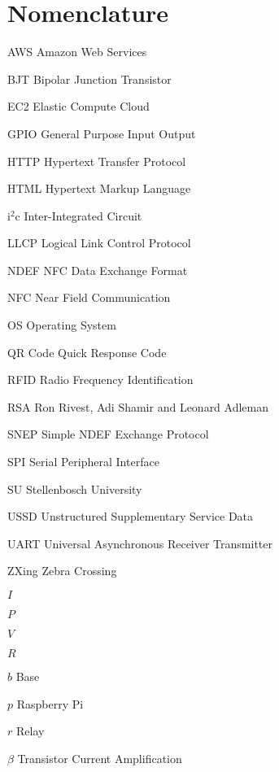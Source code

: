\chapter{Nomenclature}

\begin{Nomencl}
   \item[AWS]\dotfill Amazon Web Services
   \item[BJT]\dotfill Bipolar Junction Transistor
   \item[EC2]\dotfill Elastic Compute Cloud
   \item[GPIO]\dotfill General Purpose Input Output
   \item[HTTP]\dotfill Hypertext Transfer Protocol
   \item[HTML]\dotfill Hypertext Markup Language
   \item[i$^2$c]\dotfill Inter-Integrated Circuit
   \item[LLCP]\dotfill Logical Link Control Protocol
   \item[NDEF]\dotfill NFC Data Exchange Format
   \item[NFC]\dotfill Near Field Communication
   \item[OS]\dotfill Operating System
   \item[QR Code]\dotfill Quick Response Code
   \item[RFID]\dotfill Radio Frequency Identification
   \item[RSA]\dotfill Ron Rivest, Adi Shamir and Leonard Adleman
   \item[SNEP]\dotfill Simple NDEF Exchange Protocol
   \item[SPI]\dotfill Serial Peripheral Interface
   \item[SU]\dotfill Stellenbosch University
   \item[USSD]\dotfill Unstructured Supplementary Service Data
   \item[UART]\dotfill Universal Asynchronous Receiver Transmitter
   \item[ZXing]\dotfill Zebra Crossing
   \item[$I$]
   \item[$P$]
   \item[$V$]
   \item[$R$]
   \item[$b$]\dotfill Base
   \item[$p$]\dotfill Raspberry Pi
   \item[$r$]\dotfill Relay				%
   \item[$\beta$]\dotfill Transistor Current Amplification  
\end{Nomencl}

\endinput
